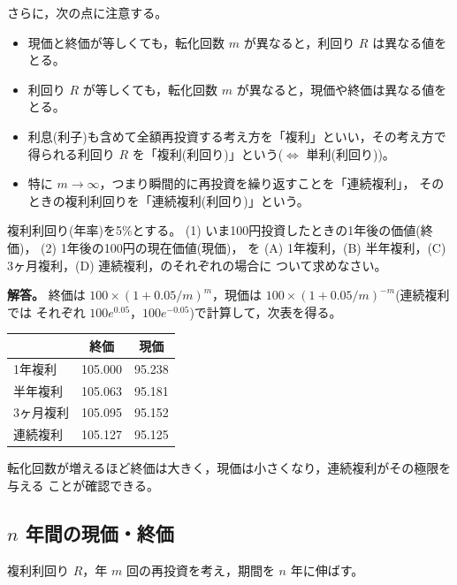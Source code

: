 さらに，次の点に注意する。
\begin{itemize}
\item 現価と終価が等しくても，転化回数 $m$ が異なると，利回り $R$ は異なる値をとる。
\item 利回り $R$ が等しくても，転化回数 $m$ が異なると，現価や終価は異なる値をとる。
\item 利息(利子)も含めて全額再投資する考え方を「複利」といい，その考え方で
得られる利回り $R$ を「複利(利回り)」という($\Leftrightarrow$ 単利(利回り))。
\item 特に $m\to\infty$，つまり瞬間的に再投資を繰り返すことを「連続複利」，
そのときの複利利回りを「連続複利(利回り)」という。
\end{itemize}

\begin{example}[例題2-1]
複利利回り(年率)を5\%とする。
(1) いま100円投資したときの1年後の価値(終価)，
(2) 1年後の100円の現在価値(現価)，
を (A) 1年複利，(B) 半年複利，(C) 3ヶ月複利，(D) 連続複利，のそれぞれの場合に
ついて求めなさい。

\medskip
\noindent\textbf{解答。}
終価は $100\times(1+0.05/m)^m$，現価は $100\times(1+0.05/m)^{-m}$(連続複利では
それぞれ $100e^{0.05}$，$100e^{-0.05}$)で計算して，次表を得る。
\vspace{0.9em}
\begin{center}
\begin{tabular}{lcc}
\toprule
 & 終価 & 現価\\
\midrule
1年複利 & 105.000 & 95.238\\
半年複利 & 105.063 & 95.181\\
3ヶ月複利 & 105.095 & 95.152\\
連続複利 & 105.127 & 95.125\\
\bottomrule
\end{tabular}
\end{center}
\vspace{0.9em}
転化回数が増えるほど終価は大きく，現価は小さくなり，連続複利がその極限を与える
ことが確認できる。
\end{example}

\vspace{18pt}

\subsection{$n$ 年間の現価・終価}

複利利回り $R$，年 $m$ 回の再投資を考え，期間を $n$ 年に伸ばす。

